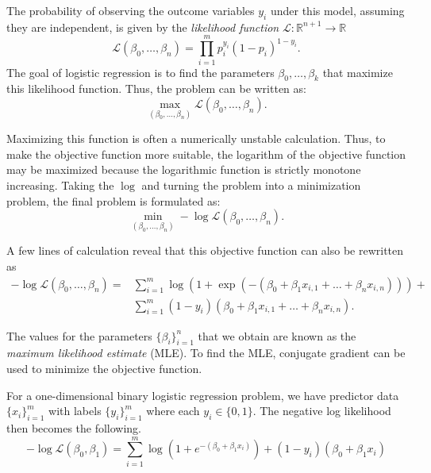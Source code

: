 The probability of observing the outcome variables $y_i$ under this model, assuming they are independent, is given by
the \emph{likelihood function} $\mathcal{L}:\mathbb{R}^{n+1} \rightarrow \mathbb{R}$
\[
\mathcal{L}(\beta_0, \dots, \beta_n) = \prod_{i=1}^m p_i^{y_i}(1-p_i)^{1-y_i}.
\]
The goal of logistic regression is to find the parameters $\beta_0, \dots, \beta_k$ that maximize this likelihood function.
Thus, the problem can be written as:
\[
\max_{(\beta_0,\dots,\beta_n)}\mathcal{L}(\beta_0, \dots, \beta_n).
\]

Maximizing this function is often a numerically unstable calculation.
Thus, to make the objective function more suitable, the logarithm of the objective function may be maximized because the logarithmic function is strictly monotone increasing.
Taking the $\log$ and turning the problem into a minimization problem, the final problem is formulated as:
\[
\min_{(\beta_0,\dots,\beta_n)} - \log\mathcal{L}(\beta_0, \dots, \beta_n).
\]

A few lines of calculation reveal that this objective function can also be rewritten as
\begin{align*}
-\log\mathcal{L}(\beta_0,\dots,\beta_n) = &\sum_{i=1}^{m}\log(1+\exp(-(\beta_0 + \beta_1x_{i,1} + \dots +\beta_nx_{i,n}))) +\\
 &\sum_{i=1}^m (1- y_i)(\beta_0 + \beta_1x_{i,1} + \dots + \beta_nx_{i,n}).
\end{align*}

The values for the parameters  $\{\beta_i\}_{i = 1}^{n}$ that we obtain are known as the \emph{maximum likelihood estimate} (MLE).
To find the MLE, conjugate gradient can be used to minimize the objective function.

For a one-dimensional binary logistic regression problem, we have predictor data $\{x_i\}_{i=1}^m$ with labels $\{y_i\}_{i=1}^m$ where each $y_i \in \{0, 1\}$.
The negative log likelihood then becomes the following.
\begin{equation}
-\log\mathcal{L}(\beta_0, \beta_1) = \sum_{i=1}^m \log(1 + e^{-(\beta_0 + \beta_1 x_i)}) + (1 - y_i)(\beta_0 + \beta_1 x_i)
\label{eq:gradientmethods-negative-log-likelihood}
\end{equation}


